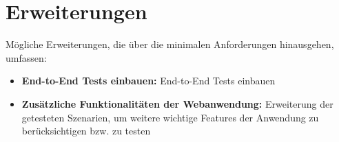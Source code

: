 \chapter{Erweiterungen}

Mögliche Erweiterungen, die über die minimalen Anforderungen hinausgehen, umfassen:
\begin{itemize}
	\item \textbf{End-to-End Tests einbauen:} 
		End-to-End Tests einbauen
	\item \textbf{Zusätzliche Funktionalitäten der Webanwendung:} Erweiterung der getesteten Szenarien, um weitere wichtige Features der Anwendung zu berücksichtigen bzw. zu testen
\end{itemize}
